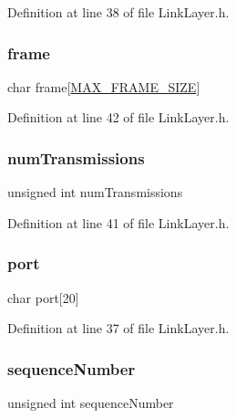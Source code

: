 Definition at line 38 of file Link\+Layer.\+h.

\hypertarget{struct_link_layers_af14a4ec6e090d2d3d7439ca5d3fd60e4}{}\label{struct_link_layers_af14a4ec6e090d2d3d7439ca5d3fd60e4} 
\subsubsection{\texorpdfstring{frame}{frame}}
{\footnotesize\ttfamily char frame\mbox{[}\hyperlink{_link_layer_8h_ad15d35a0d29a9dbf9324e3859ce3b008}{M\+A\+X\+\_\+\+F\+R\+A\+M\+E\+\_\+\+S\+I\+ZE}\mbox{]}}



Definition at line 42 of file Link\+Layer.\+h.

\hypertarget{struct_link_layers_ac032302ea4696263706fe7dd32e6e4bc}{}\label{struct_link_layers_ac032302ea4696263706fe7dd32e6e4bc} 
\subsubsection{\texorpdfstring{num\+Transmissions}{numTransmissions}}
{\footnotesize\ttfamily unsigned int num\+Transmissions}



Definition at line 41 of file Link\+Layer.\+h.

\hypertarget{struct_link_layers_a1bf41122fd2e6f904119473794d4f52b}{}\label{struct_link_layers_a1bf41122fd2e6f904119473794d4f52b} 
\subsubsection{\texorpdfstring{port}{port}}
{\footnotesize\ttfamily char port\mbox{[}20\mbox{]}}



Definition at line 37 of file Link\+Layer.\+h.

\hypertarget{struct_link_layers_ab7bd0cb3cdcb24d52a0a5ead5be21baa}{}\label{struct_link_layers_ab7bd0cb3cdcb24d52a0a5ead5be21baa} 
\subsubsection{\texorpdfstring{sequence\+Number}{sequenceNumber}}
{\footnotesize\ttfamily unsigned int sequence\+Number}



